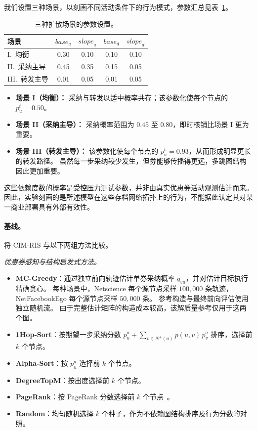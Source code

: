 \documentclass[sigconf,balance=false]{acmart}
\newcommand{\CIMRIS}{\textsc{CIM-RIS}}
\begin{document}
我们设置三种场景，以刻画不同活动条件下的行为模式，参数汇总见表~\ref{tab:scenarios}。

\begin{table}[t]
  \caption{三种扩散场景的参数设置。}
  \label{tab:scenarios}
  \centering
  \begin{tabular}{lcccc}
    \toprule
    场景 & $\mathit{base}_a$ & $\mathit{slope}_a$ &
              $\mathit{base}_d$ & $\mathit{slope}_d$ \\
    \midrule
    I.\ 均衡       & 0.30 & 0.10 & 0.10 & 0.10 \\
    II.\ 采纳主导 & 0.45 & 0.35 & 0.15 & 0.05 \\
    III.\ 转发主导 & 0.01 & 0.05 & 0.01 & 0.05 \\
    \bottomrule
  \end{tabular}
\end{table}

\begin{itemize}[leftmargin=*]
  \item \textbf{场景 I（均衡）：}
  采纳与转发以适中概率共存；该参数化使每个节点的 $p_u^t=0.50$。
  \item \textbf{场景 II（采纳主导）：}
  采纳概率范围为 $0.45$ 至 $0.80$，即时核销比场景 I 更为重要。
  \item \textbf{场景 III（转发主导）：}
  该参数化使每个节点的 $p_u^t=0.93$，从而形成明显更长的转发路径。
  虽然每一步采纳较少发生，但券能够传播得更远，多跳图结构因此更加重要。
\end{itemize}

这些依赖度数的概率是受控压力测试参数，并非由真实优惠券活动观测估计而来。
因此，实验刻画的是所述模型在这些存档网络拓扑上的行为，不能据此认定其对某一商业部署具有外部有效性。

\paragraph{基线。}
将 \CIMRIS{} 与以下两组方法比较。

\noindent\textit{优惠券感知与结构启发式方法。}
\begin{itemize}[leftmargin=*]
  \item \textbf{MC-Greedy}：通过独立前向轨迹估计单券采纳概率 $q_{vu}$，并对估计目标执行精确贪心。
  每种场景中，Netscience 每个源节点采样 $100{,}000$ 条轨迹，NetFacebookEgo 每个源节点采样 $50{,}000$ 条。
  参考构造与最终前向评估使用独立随机流。
  由于完整估计矩阵的构造成本较高，该解质量参考仅用于这两个图。
  \item \textbf{1Hop-Sort}：按期望一步采纳分数 $p_u^a+\sum_{v\in N^+(u)}p(u,v)\,p_v^a$ 排序，选择前 $k$ 个节点。
  \item \textbf{Alpha-Sort}：按 $p_u^a$ 选择前 $k$ 个节点。
  \item \textbf{DegreeTopM}：按出度选择前 $k$ 个节点。
  \item \textbf{PageRank}：按 PageRank 分数选择前 $k$ 个节点~\cite{page1999pagerank}。
  \item \textbf{Random}：均匀随机选择 $k$ 个种子，作为不依赖图结构排序及行为分数的对照。
\end{itemize}
\end{document}
